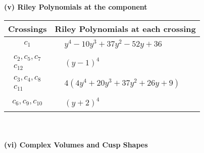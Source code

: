 \documentclass[1p]{elsarticle_modified}
\theoremstyle{definition}
\begin{document}
\newpage\renewcommand{\arraystretch}{1}
\flushleft \textbf{(v) Riley Polynomials at the component}\newline \\
\begin{tabular}{m{50pt}|m{274pt}}
Crossings & \hspace{64pt}Riley Polynomials at each crossing \\
\hline $$\begin{aligned}c_{1}\end{aligned}$$&$\begin{aligned}
&y^4-10 y^3+37 y^2-52 y+36
\end{aligned}$\\
\hline $$\begin{aligned}c_{2},c_{5},c_{7}\\c_{12}\end{aligned}$$&$\begin{aligned}
&(y-1)^4
\end{aligned}$\\
\hline $$\begin{aligned}c_{3},c_{4},c_{8}\\c_{11}\end{aligned}$$&$\begin{aligned}
&4(4 y^4+20 y^3+37 y^2+26 y+9)
\end{aligned}$\\
\hline $$\begin{aligned}c_{6},c_{9},c_{10}\end{aligned}$$&$\begin{aligned}
&(y+2)^4
\end{aligned}$\\
\hline
\end{tabular}\\~\\
\newpage\flushleft \textbf{(vi) Complex Volumes and Cusp Shapes}
\end{document}
